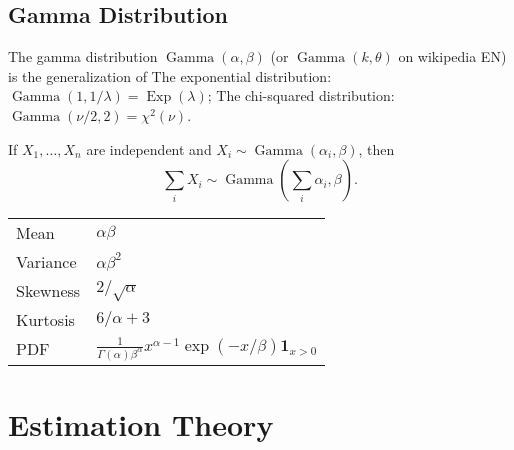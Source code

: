 \documentclass[10pt]{article}
\DeclareMathOperator{\GammaDist}{Gamma}
\DeclareMathOperator{\Exp}{Exp}
\begin{document}
\subsection{Gamma Distribution}
\begin{outline}
  \1 The gamma distribution $\GammaDist(\alpha,\beta)$ (or $\GammaDist(k,\theta)$ on
  wikipedia EN) is the generalization of 
  \2 The exponential distribution:
  $\GammaDist(1,1/\lambda) = \Exp(\lambda)$; 
  \2 The chi-squared distribution:
  $\GammaDist(\nu/2,2) = \chi^2(\nu)$.

  \1 If $X_1,\dots,X_n$ are independent and $X_i\sim\GammaDist(\alpha_i,\beta)$, then
  \begin{equation*}
    \sum_iX_i \sim \GammaDist(\sum_i \alpha_i,\beta).
  \end{equation*}

  \1 
  \begin{tabular}{ll}
    \toprule
    Mean & $\alpha\beta$\\
    Variance & $\alpha\beta^2$\\
    Skewness & $2/\sqrt{\alpha}$\\
    Kurtosis & $6/\alpha + 3$\\
    PDF & $\displaystyle \frac{1}{\Gamma(\alpha)\beta^\alpha} x^{\alpha-1} \exp(-x/\beta)
          \bm 1_{x>0}$\\
    \bottomrule
  \end{tabular}
\end{outline}


\section{Estimation Theory}
\end{document}
